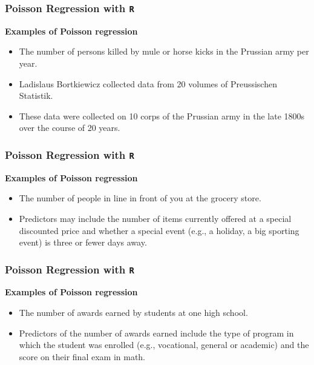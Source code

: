 \documentclass[00-GLMregslides.tex]{subfiles}
\begin{document}
\begin{frame}[fragile]

\frametitle{Poisson Regression with \texttt{R} } 
\Large	
\textbf{Examples of Poisson regression} 

\begin{itemize}
\item The number of persons killed by mule or horse kicks in the Prussian army per year. 
\item Ladislaus Bortkiewicz collected data from 20 volumes of Preussischen Statistik. 
\item These data were collected on 10 corps of the Prussian army in the late 1800s over the course of 20 years.
\end{itemize}

\end{frame}
\begin{frame}[fragile]

\frametitle{Poisson Regression with \texttt{R} }
\Large	 
\textbf{Examples of Poisson regression}
\begin{itemize}	
\item The number of people in line in front of you at the grocery store. 
\item Predictors may include the number of items currently offered at a special discounted price and whether a special event (e.g., a holiday, a big sporting event) is three or fewer days away.
\end{itemize}
\end{frame}

\begin{frame}[fragile]

\frametitle{Poisson Regression with \texttt{R} } 
 
 \Large	
 
 \textbf{Examples of Poisson regression} \\
 	
 \begin{itemize}	
 \item The number of awards earned by students at one high school. 
 \item Predictors of the number of awards earned include the type of program in which the student was enrolled (e.g., vocational, general or academic) and the score on their final exam in math.
 \end{itemize}
 
\end{frame}
\end{document}
